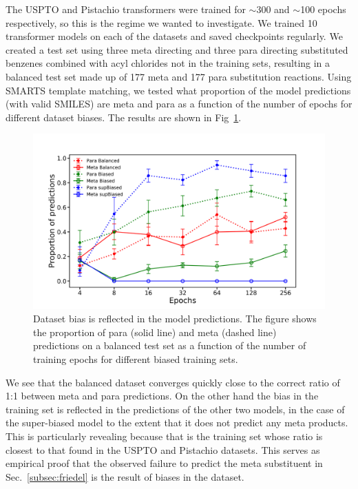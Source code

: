 The USPTO and Pistachio transformers were trained for $\sim$300 and $\sim$100 epochs respectively, so this is the regime we wanted to investigate. We trained 10 transformer models on each of the datasets and saved checkpoints regularly. We created a test set using three meta directing and three para directing substituted benzenes combined with acyl chlorides not in the training sets, resulting in a balanced test set made up of 177 meta and 177 para substitution reactions. Using SMARTS template matching, we tested what proportion of the model predictions (with valid SMILES) are meta and para as a function of the number of epochs for different dataset biases. The results are shown in Fig~\ref{fig:synth_conv}. 

\begin{figure}[htbp!] 
\centering    
\includegraphics[width=1.0\textwidth]{Chapters/Ch4/Figs/synth_conv.png}
\caption{Dataset bias is reflected in the model predictions. The figure shows the proportion of para (solid line) and meta (dashed line) predictions on a balanced test set as a function of the number of training epochs for different biased training sets. }
\label{fig:synth_conv}
\end{figure}

We see that the balanced dataset converges quickly close to the correct ratio of 1:1 between meta and para predictions. On the other hand the bias in the training set is reflected in the predictions of the other two models, in the case of the super-biased model to the extent that it does not predict any meta products. This is particularly revealing because that is the training set whose ratio is closest to that found in the USPTO and Pistachio datasets. This serves as empirical proof that the observed failure to predict the meta substituent in Sec.~\ref{subsec:friedel} is the result of biases in the dataset. 

